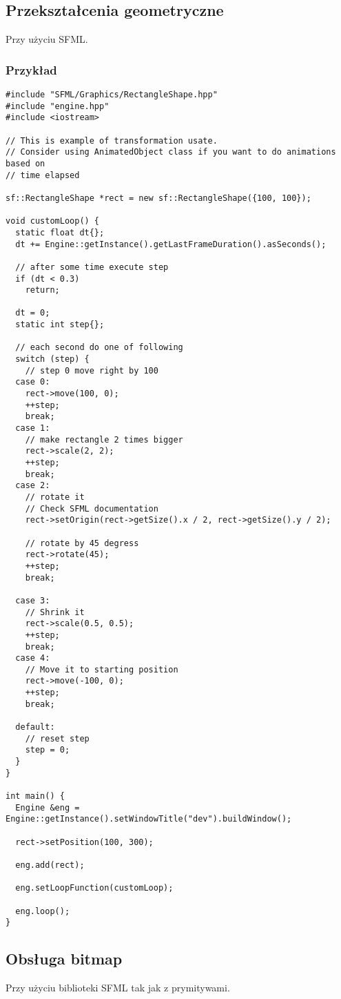 \documentclass[11pt]{article}
\begin{document}
\subsection{Przekształcenia geometryczne}
\label{sec:org4d4b31e}
Przy użyciu SFML.
\subsubsection{Przykład}
\label{sec:org9f34f5f}

\begin{verbatim}
#include "SFML/Graphics/RectangleShape.hpp"
#include "engine.hpp"
#include <iostream>

// This is example of transformation usate.
// Consider using AnimatedObject class if you want to do animations based on
// time elapsed

sf::RectangleShape *rect = new sf::RectangleShape({100, 100});

void customLoop() {
  static float dt{};
  dt += Engine::getInstance().getLastFrameDuration().asSeconds();

  // after some time execute step
  if (dt < 0.3)
    return;

  dt = 0;
  static int step{};

  // each second do one of following
  switch (step) {
    // step 0 move right by 100
  case 0:
    rect->move(100, 0);
    ++step;
    break;
  case 1:
    // make rectangle 2 times bigger
    rect->scale(2, 2);
    ++step;
    break;
  case 2:
    // rotate it
    // Check SFML documentation
    rect->setOrigin(rect->getSize().x / 2, rect->getSize().y / 2);

    // rotate by 45 degress
    rect->rotate(45);
    ++step;
    break;

  case 3:
    // Shrink it
    rect->scale(0.5, 0.5);
    ++step;
    break;
  case 4:
    // Move it to starting position
    rect->move(-100, 0);
    ++step;
    break;

  default:
    // reset step
    step = 0;
  }
}

int main() {
  Engine &eng = Engine::getInstance().setWindowTitle("dev").buildWindow();

  rect->setPosition(100, 300);

  eng.add(rect);

  eng.setLoopFunction(customLoop);

  eng.loop();
}
\end{verbatim}
\subsection{Obsługa bitmap}
\label{sec:org7575cd0}
Przy użyciu biblioteki SFML tak jak z prymitywami.
\end{document}
